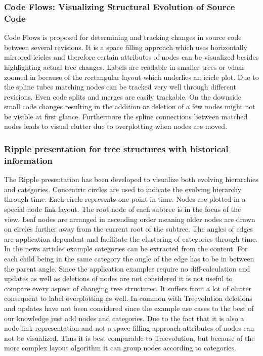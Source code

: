 \subsubsection{Code Flows: Visualizing Structural Evolution of Source Code\cite{telea2008code}}
Code Flows is proposed for determining and tracking changes in source code between several revisions. It is a space filling approach which uses horizontally mirrored icicles and therefore certain attributes of nodes can be visualized besides highlighting actual tree changes. Labels are readable in smaller trees or when zoomed in because of the rectangular layout which underlies an icicle plot. Due to the spline tubes matching nodes can be tracked very well through different revisions. Even code splits and merges are easily trackable. On the downside small code changes resulting in the addition or deletion of a few nodes might not be visible at first glance. Furthermore the spline connections between matched nodes leads to visual clutter due to overplotting when nodes are moved.


\subsubsection{Ripple presentation for tree structures with historical information\cite{ishihara2006ripple}}
The Ripple presentation has been developed to visualize both evolving hierarchies and categories. Concentric circles are used to indicate the evolving hierarchy through time. Each circle represents one point in time. Nodes are plotted in a special node link layout. The root node of each subtree is in the focus of the view. Leaf nodes are arranged in ascending order meaning older nodes are drawn on circles further away from the current root of the subtree. The angles of edges are application dependent and facilitate the clustering of categories through time. In the news articles example categories can be extracted from the content. For each child being in the same category the angle of the edge has to be in between the parent angle. Since the application examples require no diff-calculation and updates as well as deletions of nodes are not considered it is not useful to compare every aspect of changing tree structures. It suffers from a lot of clutter consequent to label overplotting as well. In common with Treevolution deletions and updates have not been considered since the example use cases to the best of our knowledge just add nodes and categories. Due to the fact that it is also a node link representation and not a space filling approach attributes of nodes can not be visualized. Thus it is best comparable to Treevolution, but because of the more complex layout algorithm it can group nodes according to categories. 

